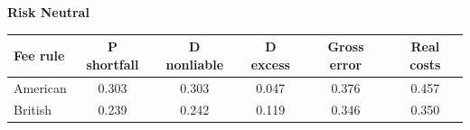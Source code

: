 \documentclass[10pt,border=5pt,varwidth=17cm]{standalone}
\begin{document}
\begingroup
\small
\setlength{\tabcolsep}{5pt}
\renewcommand{\arraystretch}{1.20}
\noindent\textbf{Risk Neutral}\par\smallskip
\noindent\begin{tabularx}{\linewidth}{@{}>{\raggedright\arraybackslash}Xccccc@{}}
\toprule
\textbf{Fee rule} & \textbf{P shortfall} & \textbf{D nonliable} & \textbf{D excess} & \textbf{Gross error} & \textbf{Real costs} \\
\midrule
American & 0.303 & 0.303 & 0.047 & 0.376 & 0.457 \\
British & 0.239 & 0.242 & 0.119 & 0.346 & 0.350 \\
\bottomrule\end{tabularx}\par\medskip
\endgroup
\end{document}
